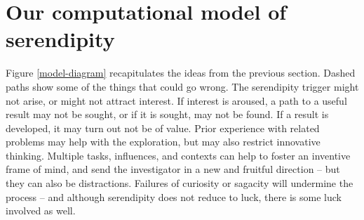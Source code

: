 \section{Our computational model of serendipity} \label{sec:our-model}

Figure \ref{model-diagram} recapitulates the ideas from the previous
section.  Dashed paths show some of the things that could go wrong.
The serendipity trigger might not arise, or might not attract
interest.  If interest is aroused, a path to a useful result may not
be sought, or if it is sought, may not be found.  If a result is
developed, it may turn out not be of value.  Prior experience with
related problems may help with the exploration, but may also restrict
innovative thinking.  Multiple tasks, influences, and contexts can help to foster
an inventive frame of mind, and send the investigator in a
new and fruitful direction -- but they can also be distractions.
Failures of curiosity or sagacity will undermine the process -- and
although serendipity does not reduce to luck, there is some luck
involved as well.

